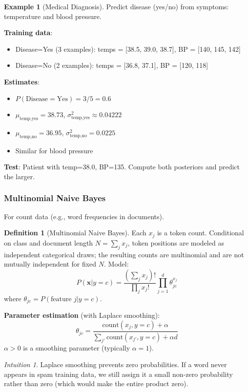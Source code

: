 \documentclass[11pt,twoside]{article}
\numberwithin{equation}{section}
\newcommand{\vect}[1]{\bm{#1}}
\theoremstyle{plain}
\theoremstyle{definition}
\newtheorem{definition}[theorem]{Definition}
\newtheorem{example}[theorem]{Example}
\theoremstyle{remark}
\newtheorem{intuition}[theorem]{Intuition}
\begin{document}
\begin{example}[Medical Diagnosis]
Predict disease (yes/no) from symptoms: temperature and blood pressure.

\textbf{Training data}:
\begin{itemize}
\item Disease=Yes (3 examples): temps = [38.5, 39.0, 38.7], BP = [140, 145, 142]
\item Disease=No (2 examples): temps = [36.8, 37.1], BP = [120, 118]
\end{itemize}

\textbf{Estimates}:
\begin{itemize}
\item $P(\text{Disease}=\text{Yes}) = 3/5 = 0.6$
\item $\mu_{\text{temp,yes}} = 38.73$, $\sigma_{\text{temp,yes}}^2 \approx 0.04222$
\item $\mu_{\text{temp,no}} = 36.95$, $\sigma_{\text{temp,no}}^2 = 0.0225$
\item Similar for blood pressure
\end{itemize}

\textbf{Test}: Patient with temp=38.0, BP=135. Compute both posteriors and predict the larger.
\end{example}

\subsubsection{Multinomial Naive Bayes}

For count data (e.g., word frequencies in documents).

\begin{definition}[Multinomial Naive Bayes]
Each $x_j$ is a token count. Conditional on class and document length $N=\sum_jx_j$, token positions are modeled as independent categorical draws; the resulting counts are multinomial and are not mutually independent for fixed $N$. Model:
\[
P(\vect{x} | y=c) = \frac{\left(\sum_j x_j\right)!}{\prod_j x_j!} \prod_{j=1}^d \theta_{jc}^{x_j}
\]
where $\theta_{jc} = P(\text{feature } j | y=c)$.

\textbf{Parameter estimation} (with Laplace smoothing):
\[
\theta_{jc} = \frac{\text{count}(x_j, y=c) + \alpha}{\sum_{j'} \text{count}(x_{j'}, y=c) + \alpha d}
\]
$\alpha > 0$ is a smoothing parameter (typically $\alpha=1$).
\end{definition}

\begin{intuition}
Laplace smoothing prevents zero probabilities. If a word never appears in spam training data, we still assign it a small non-zero probability rather than zero (which would make the entire product zero).
\end{intuition}
\end{document}
